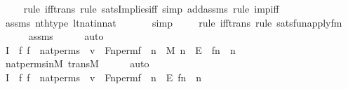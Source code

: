\begin{isabellebody}
\ \ \ \ \isamarkupfalse%
{\isacharparenleft}{\kern0pt}rule\ iff{\isacharunderscore}{\kern0pt}trans{\isacharcomma}{\kern0pt}\ rule\ sats{\isacharunderscore}{\kern0pt}Implies{\isacharunderscore}{\kern0pt}iff{\isacharcomma}{\kern0pt}\ simp\ add{\isacharcolon}{\kern0pt}assms{\isacharcomma}{\kern0pt}\ rule\ imp{\isacharunderscore}{\kern0pt}iff{}{\isacharparenright}{\kern0pt}\isanewline
\ \ \ \ \isamarkupfalse%
\ assms\ nth{\isacharunderscore}{\kern0pt}type\ lt{\isacharunderscore}{\kern0pt}nat{\isacharunderscore}{\kern0pt}in{\isacharunderscore}{\kern0pt}nat\isanewline
\ \ \ \ \ \isamarkupfalse%
\ simp\isanewline
\ \ \ \ \isamarkupfalse%
{\isacharparenleft}{\kern0pt}rule\ iff{\isacharunderscore}{\kern0pt}trans{\isacharcomma}{\kern0pt}\ rule\ sats{\isacharunderscore}{\kern0pt}fun{\isacharunderscore}{\kern0pt}apply{\isacharunderscore}{\kern0pt}fm{\isacharparenright}{\kern0pt}\isanewline
\ \ \ \ \isamarkupfalse%
\ assms\isanewline
\ \ \ \ \isamarkupfalse%
\ auto\isanewline
\ \ \isamarkupfalse%
\ I{}{\isacharcolon}{\kern0pt}{\isachardoublequoteopen}{\isachardot}{\kern0pt}{\isachardot}{\kern0pt}{\isachardot}{\kern0pt}\ {\isasymlongleftrightarrow}\ {\isacharparenleft}{\kern0pt}{\isasymexists}f{\isachardot}{\kern0pt}\ f\ {\isasymin}\ nat{\isacharunderscore}{\kern0pt}perms\ {\isasymand}\ v\ {\isacharequal}{\kern0pt}\ Fn{\isacharunderscore}{\kern0pt}perm{\isacharprime}{\kern0pt}{\isacharparenleft}{\kern0pt}f{\isacharparenright}{\kern0pt}\ {\isasymand}\ {\isacharparenleft}{\kern0pt}{\isasymforall}n\ {\isasymin}\ M{\isachardot}{\kern0pt}\ n\ {\isasymin}\ E\ {\isasymlongrightarrow}\ f{\isacharbackquote}{\kern0pt}n\ {\isacharequal}{\kern0pt}\ n{\isacharparenright}{\kern0pt}{\isacharparenright}{\kern0pt}{\isachardoublequoteclose}\ \isanewline
\ \ \ \ \isamarkupfalse%
\ nat{\isacharunderscore}{\kern0pt}perms{\isacharunderscore}{\kern0pt}in{\isacharunderscore}{\kern0pt}M\ transM\isanewline
\ \ \ \ \isamarkupfalse%
\ auto\isanewline
\ \ \isamarkupfalse%
\ I{}{\isacharcolon}{\kern0pt}{\isachardoublequoteopen}{\isachardot}{\kern0pt}{\isachardot}{\kern0pt}{\isachardot}{\kern0pt}\ {\isasymlongleftrightarrow}\ {\isacharparenleft}{\kern0pt}{\isasymexists}f{\isachardot}{\kern0pt}\ f\ {\isasymin}\ nat{\isacharunderscore}{\kern0pt}perms\ {\isasymand}\ v\ {\isacharequal}{\kern0pt}\ Fn{\isacharunderscore}{\kern0pt}perm{\isacharprime}{\kern0pt}{\isacharparenleft}{\kern0pt}f{\isacharparenright}{\kern0pt}\ {\isasymand}\ {\isacharparenleft}{\kern0pt}{\isasymforall}n\ {\isasymin}\ E{\isachardot}{\kern0pt}\ f{\isacharbackquote}{\kern0pt}n\ {\isacharequal}{\kern0pt}\ n{\isacharparenright}{\kern0pt}{\isacharparenright}{\kern0pt}{\isachardoublequoteclose}\ \isanewline

\end{isabellebody}
